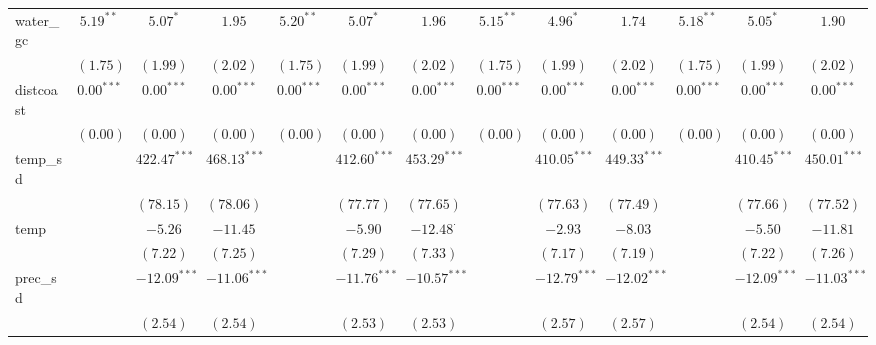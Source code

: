 \begin{sidewaystable}
\begin{center}
{\begin{tabular}{l c c c c c c c c c c c c}
water\_gc           & $5.19^{**}$    & $5.07^{*}$     & $1.95$         & $5.20^{**}$    & $5.07^{*}$      & $1.96$           & $5.15^{**}$    & $4.96^{*}$      & $1.74$         & $5.18^{**}$    & $5.05^{*}$     & $1.90$         \\
                    & $(1.75)$       & $(1.99)$       & $(2.02)$       & $(1.75)$       & $(1.99)$        & $(2.02)$         & $(1.75)$       & $(1.99)$        & $(2.02)$       & $(1.75)$       & $(1.99)$       & $(2.02)$       \\
distcoast           & $0.00^{***}$   & $0.00^{***}$   & $0.00^{***}$   & $0.00^{***}$   & $0.00^{***}$    & $0.00^{***}$     & $0.00^{***}$   & $0.00^{***}$    & $0.00^{***}$   & $0.00^{***}$   & $0.00^{***}$   & $0.00^{***}$   \\
                    & $(0.00)$       & $(0.00)$       & $(0.00)$       & $(0.00)$       & $(0.00)$        & $(0.00)$         & $(0.00)$       & $(0.00)$        & $(0.00)$       & $(0.00)$       & $(0.00)$       & $(0.00)$       \\
temp\_sd            &                & $422.47^{***}$ & $468.13^{***}$ &                & $412.60^{***}$  & $453.29^{***}$   &                & $410.05^{***}$  & $449.33^{***}$ &                & $410.45^{***}$ & $450.01^{***}$ \\
                    &                & $(78.15)$      & $(78.06)$      &                & $(77.77)$       & $(77.65)$        &                & $(77.63)$       & $(77.49)$      &                & $(77.66)$      & $(77.52)$      \\
temp                &                & $-5.26$        & $-11.45$       &                & $-5.90$         & $-12.48^{\cdot}$ &                & $-2.93$         & $-8.03$        &                & $-5.50$        & $-11.81$       \\
                    &                & $(7.22)$       & $(7.25)$       &                & $(7.29)$        & $(7.33)$         &                & $(7.17)$        & $(7.19)$       &                & $(7.22)$       & $(7.26)$       \\
prec\_sd            &                & $-12.09^{***}$ & $-11.06^{***}$ &                & $-11.76^{***}$  & $-10.57^{***}$   &                & $-12.79^{***}$  & $-12.02^{***}$ &                & $-12.09^{***}$ & $-11.03^{***}$ \\
                    &                & $(2.54)$       & $(2.54)$       &                & $(2.53)$        & $(2.53)$         &                & $(2.57)$        & $(2.57)$       &                & $(2.54)$       & $(2.54)$       \\

\end{tabular}}
\end{center}
\end{sidewaystable}
